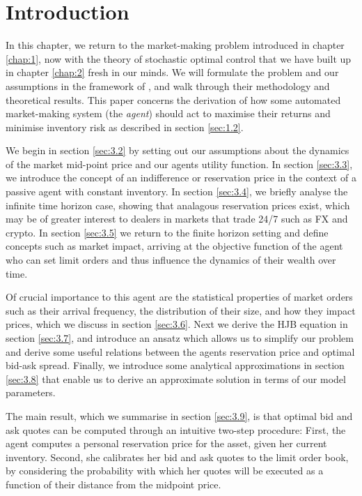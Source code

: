 \section{Introduction}\label{sec:3.1}
In this chapter, we return to the market-making problem introduced in
chapter \ref{chap:1}, now with the theory of stochastic optimal control 
that we have built up in chapter \ref{chap:2} fresh in our minds. We will formulate 
the problem and our assumptions in the framework of \textcite{AS2008}, and walk through
their methodology and theoretical results. This paper concerns the derivation of how 
some automated market-making system (the \emph{agent}) should act to maximise their 
returns and minimise inventory risk as described in section \ref{sec:1.2}.

We begin in section \ref{sec:3.2} by setting out our assumptions about 
the dynamics of the market mid-point price and our agents utility function. In section 
\ref{sec:3.3}, we introduce the concept of an indifference or reservation price in the 
context of a passive agent with constant inventory. In section
\ref{sec:3.4}, we briefly analyse the infinite time horizon case, showing that 
analagous reservation prices exist, which may be of greater interest to dealers in 
markets that trade 24/7 such as FX and crypto. In section \ref{sec:3.5} we return to 
the finite horizon setting and define concepts such as market impact, arriving at the 
objective function of the agent who can set limit orders and thus influence the dynamics 
of their wealth over time. 

Of crucial importance to this
agent are the statistical properties of market orders such as their arrival frequency, the 
distribution of their size, and how they impact prices, which we discuss in section
\ref{sec:3.6}. Next we derive the HJB equation in section \ref{sec:3.7},
and introduce an ansatz which allows us to simplify our problem and derive some useful
relations between the agents reservation price and optimal bid-ask spread. Finally,
we introduce some analytical approximations in section \ref{sec:3.8} that enable us to
derive an approximate solution in terms of our model parameters. 

The main result, which
we summarise in section \ref{sec:3.9}, is that optimal bid and ask quotes can be computed
through an intuitive two-step procedure: First, the agent computes a personal reservation
price for the asset, given her current inventory. Second, she calibrates her bid and ask
quotes to the limit order book, by considering the probability with which her quotes will
be executed as a function of their distance from the midpoint price.

